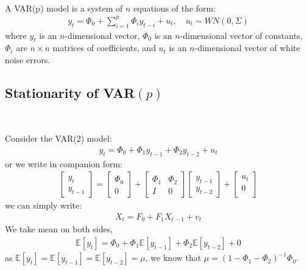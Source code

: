 \begin{definition}[VAR$(p)$]
    \

    A VAR(p) model is a system of $n$ equations of the form:
    \begin{gather*}
        y_t = \Phi_0 + \sum_{i=1}^{p} \Phi_i y_{t-i} + u_t, \quad u_t \sim WN(0, \Sigma)
    \end{gather*}
    where $y_t$ is an $n$-dimensional vector, $\Phi_0$ is an $n$-dimensional vector of constants, $\Phi_i$ are $n \times n$ matrices of coefficients, and $u_t$ is an $n$-dimensional vector of white noise errors.
\end{definition}

\subsection{Stationarity of VAR\texorpdfstring{$(p)$}{(p)}}\label{sec:stationarity-var}
\begin{eg}
    \

    Consider the VAR(2) model:
    \begin{gather*}
        y_t = \Phi_0 + \Phi_1 y_{t-1} + \Phi_2 y_{t-2} + u_t
    \end{gather*}
    or we write in companion form:
    \begin{gather*}
        \begin{bmatrix}
            y_t \\
            y_{t-1}
        \end{bmatrix} = \begin{bmatrix}
            \Phi_0 \\
            0
        \end{bmatrix} + \begin{bmatrix}
            \Phi_1 & \Phi_2 \\
            I & 0
        \end{bmatrix} 
        \begin{bmatrix}
            y_{t-1} \\
            y_{t-2}
        \end{bmatrix} + \begin{bmatrix}
             u_t \\
             0 \\
        \end{bmatrix}
    \end{gather*}
    we can simply write:
    \begin{gather*}
        X_t = F_0 + F_1 X_{t-1} + v_t
    \end{gather*}
    We take mean on both sides,
    \begin{gather*}
        \mathbb{E}[y_t] = \Phi_0 + \Phi_1 \mathbb{E}[y_{t-1}] + \Phi_2 \mathbb{E}[y_{t-2}] + 0
    \end{gather*}
    as $\mathbb{E}[y_t] = \mathbb{E}[y_{t-1}] = \mathbb{E}[y_{t-2}] = \mu$,
    we know that $\mu = \left(1 - \Phi_1 - \Phi_2\right)^{-1} \Phi_0.$
\end{eg}

